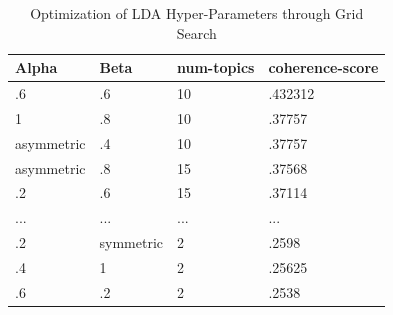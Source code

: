 \documentclass{article}
\begin{document}
{\begin{table}[H]
	\caption{Optimization of LDA Hyper-Parameters through Grid Search}
	\centering
	\begin{tabular}{llll}
		\toprule
		\midrule
		Alpha  & Beta & num-topics & coherence-score\\
		\midrule
		\midrule
		.6 & .6 & 10 & .432312   \\
		\midrule
		1 & .8 & 10 & .37757     \\
		\midrule
		asymmetric & .4 & 10 & .37757  \\
		\midrule
		asymmetric & .8 & 15 & .37568  \\
		\midrule 
		.2 & .6 & 15 & .37114    \\
		\midrule 
		... & ... & ... & ...    \\
		\midrule 
		.2 & symmetric & 2 & .2598    \\
		\midrule 
		.4 & 1 & 2 & .25625   \\
		\midrule 
		.6 & .2 & 2 & .2538   \\
		\bottomrule
	\end{tabular}
\end{table}

}
\end{document}
